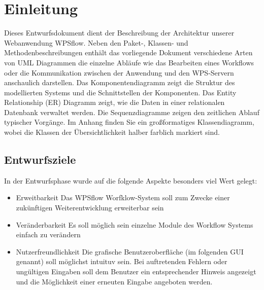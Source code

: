 \chapter{Einleitung}

    Dieses Entwurfsdokument dient der Beschreibung der Architektur unserer Webanwendung WPSflow.
    Neben den Paket-, Klassen- und Methodenbeschreibungen enthält das vorliegende Dokument verschiedene Arten von \Gls{UML} Diagrammen die einzelne Abläufe wie das Bearbeiten eines Workflows oder die Kommunikation zwischen der Anwendung und den \gls{WPS}-Servern anschaulich darstellen. \newline
    Das Komponentendiagramm zeigt die Struktur des modellierten Systems und die Schnittstellen der Komponenten. \newline
    Das Entity Relationship (ER) Diagramm zeigt, wie die Daten in einer relationalen Datenbank verwaltet werden.\newline
    Die Sequenzdiagramme zeigen den zeitlichen Ablauf typischer Vorgänge.\newline 
    Im Anhang finden Sie ein großformatiges Klassendiagramm, wobei die Klassen der Übersichtlichkeit halber farblich markiert sind.
    \newline
    \section{Entwurfsziele}
    In der Entwurfsphase wurde auf die folgende Aspekte besonders viel Wert gelegt:
        \begin{itemize}
            \item Erweitbarkeit \newline
                Das WPSflow Worfklow-System soll zum Zwecke einer zukünftigen Weiterentwicklung erweiterbar sein
            \item Veränderbarkeit \newline
                Es soll möglich sein einzelne Module des Workflow Systems einfach zu verändern 
            \item Nutzerfreundlichkeit \newline
                Die grafische Benutzeroberfläche (im folgenden GUI genannt) soll möglichst intuituv sein. Bei auftretenden Fehlern oder ungültigen Eingaben soll dem Benutzer ein entsprechender Hinweis angezeigt und die Möglichkeit einer erneuten Eingabe angeboten werden.
        \end{itemize}
    
        